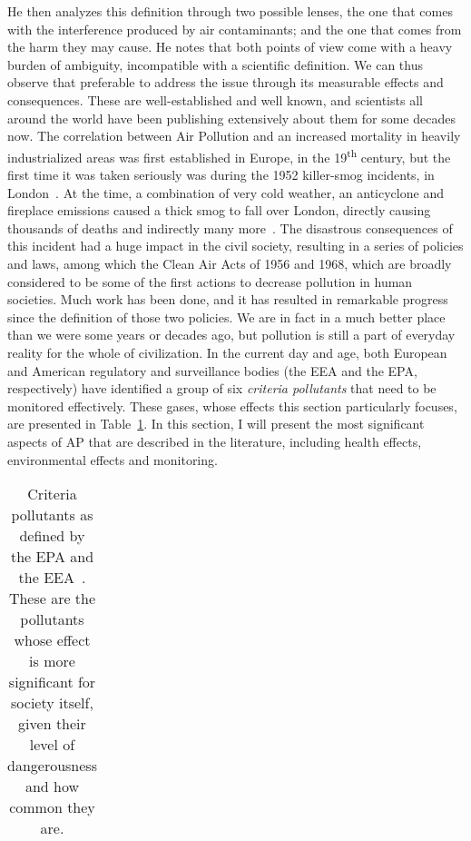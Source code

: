 He then analyzes this definition through two possible lenses, the one
that comes with the interference produced by air contaminants; and the
one that comes from the harm they may cause. He notes that both points
of view come with a heavy burden of ambiguity, incompatible with a
scientific definition. We can thus observe that preferable to address
the issue through its measurable effects and consequences. These are
well-established and well known, and scientists all around the world
have been publishing extensively about them for some decades now. The
correlation between Air Pollution and an increased mortality in heavily
industrialized areas was first established in Europe, in the
19\textsuperscript{th} century, but the first time it was taken
seriously was during the 1952 killer-smog incidents, in
London~\cite{Platt2007}. At the time, a combination of very cold
weather, an anticyclone and fireplace emissions caused a thick smog to
fall over London, directly causing thousands of deaths and indirectly
many more~\cite{Bell2008,Office2019}. The disastrous consequences of
this incident had a huge impact in the civil society, resulting in a
series of policies and laws, among which the Clean Air Acts of 1956 and
1968, which are broadly considered to be some of the first actions to
decrease pollution in human societies. Much work has been done, and it
has resulted in remarkable progress since the definition of those two
policies. We are in fact in a much better place than we were some years
or decades ago, but pollution is still a part of everyday reality for
the whole of civilization. In the current day and age, both European and
American regulatory and surveillance bodies (the \gls{EEA} and the
\gls{EPA}, respectively) have identified a group of six \emph{criteria
pollutants} that need to be monitored effectively. These gases, whose
effects this section particularly focuses, are presented in
Table~\ref{tab:criteria_pollutants}. In this section, I will present the
most significant aspects of \gls{AP} that are described in the
literature, including health effects, environmental effects and
 monitoring.

\begin{table}[htpb]
    \centering
    \caption{Criteria pollutants as defined by the EPA and the
    EEA~\cite{CABI2019}. These are the pollutants whose effect is more
    significant for society itself, given their level of dangerousness and
    how common they are.}
    \label{tab:criteria_pollutants}
    \begin{tabular}{c}
    
    \end{tabular}
\end{table}

